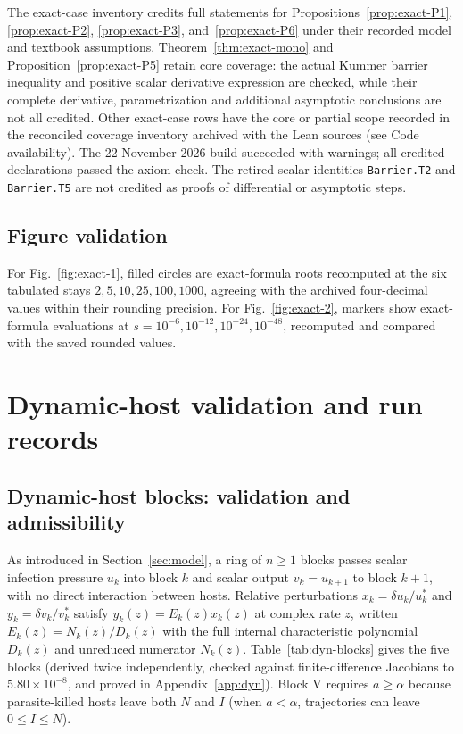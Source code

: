 The exact-case inventory credits full statements for Propositions~\ref{prop:exact-P1}, \ref{prop:exact-P2}, \ref{prop:exact-P3}, and~\ref{prop:exact-P6} under their recorded model and textbook assumptions. Theorem~\ref{thm:exact-mono} and Proposition~\ref{prop:exact-P5} retain core coverage: the actual Kummer barrier inequality and positive scalar derivative expression are checked, while their complete derivative, parametrization and additional asymptotic conclusions are not all credited. Other exact-case rows have the core or partial scope recorded in the reconciled coverage inventory archived with the Lean sources (see Code availability). The 22 November 2026 build succeeded with warnings; all credited declarations passed the axiom check. The retired scalar identities \texttt{Barrier.T2} and \texttt{Barrier.T5} are not credited as proofs of differential or asymptotic steps.

\subsection{Figure validation}\label{esm:exact-figure-checks}

For Fig.~\ref{fig:exact-1}, filled circles are exact-formula roots recomputed at the six tabulated stays $2,5,10,25,100,1000$, agreeing with the archived four-decimal values within their rounding precision. For Fig.~\ref{fig:exact-2}, markers show exact-formula evaluations at $s=10^{-6},10^{-12},10^{-24},10^{-48}$, recomputed and compared with the saved rounded values.

\section{Dynamic-host validation and run records}\label{esm:from-main-dynamics}

\subsection{Dynamic-host blocks: validation and admissibility}\label{esm:trim-dyn-blocks}
As introduced in Section~\ref{sec:model}, a ring of $n \ge 1$ blocks passes scalar infection pressure $u_k$ into block $k$ and scalar output $v_k = u_{k+1}$ to block $k + 1$, with no direct interaction between hosts. Relative perturbations $x_k = \delta u_k / u_k^*$ and $y_k = \delta v_k / v_k^*$ satisfy $y_k(z) = E_k(z)x_k(z)$ at complex rate $z$, written $E_k(z) = N_k(z)/D_k(z)$ with the full internal characteristic polynomial $D_k(z)$ and unreduced numerator $N_k(z)$. Table~\ref{tab:dyn-blocks} gives the five blocks (derived twice independently, checked against finite-difference Jacobians to $5.80 \times 10^{-8}$, and proved in Appendix~\ref{app:dyn}). Block V requires $a \ge \alpha$ because parasite-killed hosts leave both $N$ and $I$ (when $a < \alpha$, trajectories can leave $0 \le I \le N$).


